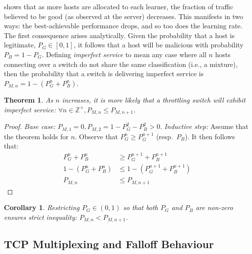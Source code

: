 \documentclass[conference, letterpaper, 10pt, times]{IEEEtran}
\newtheorem{thm}{Theorem}
\newtheorem{corr}{Corollary}[thm]
\begin{document}
 shows that as more hosts are allocated to each learner, the fraction of traffic believed to be good (as observed at the server) decreases.
This manifests in two ways: the best-achievable performance drops, and so too does the learning rate.
The first consequence arises analytically.
Given the probability that a host is legitimate, $P_G \in [0,1]$, it follows that a host will be malicious with probability $P_B = 1 - P_G$.
Defining \emph{imperfect service} to mean any case where all $n$ hosts connecting over a switch do not share the same classification (i.e., a mixture), then the probability that a switch is delivering imperfect service is $P_{M,n} = 1 - (P_G^n + P_B^n)$.
\begin{thm}
	As $n$ increases, it is more likely that a throttling switch will exhibit imperfect service: $\forall n \in \mathbb{Z}^{+}, P_{M,n} \le P_{M,n+1}$.
\end{thm}
\begin{proof}
	\emph{Base case:} $P_{M,1}=0, P_{M,2} = 1 - P_G^2 - P_B^2 > 0$.
	\emph{Inductive step:} Assume that the theorem holds for $n$. Observe that $P_G^n \ge P_G^{n+1}$ (resp.\ $P_B$). It then follows that:
	\begin{align*}
	P_G^n + P_B^n &\ge P_G^{n+1} + P_B^{n+1}\\
	1 - (P_G^n + P_B^n) &\le 1 - (P_G^{n+1} + P_B^{n+1})\\
	P_{M,n} &\le P_{M,n+1}
	\end{align*}
\end{proof}
\begin{corr}
	Restricting $P_G \in (0,1)$ so that both $P_G$ and $P_B$ are non-zero ensures strict inequality: $P_{M,n} < P_{M,n+1}$.
\end{corr}


\subsection{TCP Multiplexing and Falloff Behaviour}\label{sec:tcp-multiplexing-and-fallback-behaviour}

\end{document}

